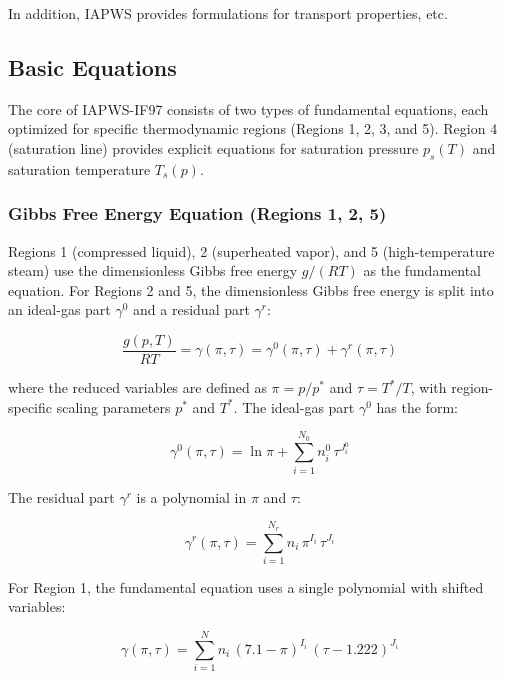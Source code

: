 \documentclass{article}
\begin{document}
In addition, IAPWS\cite{IAPWS-Releases} provides formulations for transport properties, etc.

\subsection{Basic Equations}

The core of IAPWS-IF97 consists of two types of fundamental equations, each optimized for specific thermodynamic regions (Regions 1, 2, 3, and 5). Region 4 (saturation line) provides explicit equations for saturation pressure $p_s(T)$ and saturation temperature $T_s(p)$.

\subsubsection{Gibbs Free Energy Equation (Regions 1, 2, 5)}

Regions 1 (compressed liquid), 2 (superheated vapor), and 5 (high-temperature steam) use the dimensionless Gibbs free energy $g/(RT)$ as the fundamental equation. For Regions 2 and 5, the dimensionless Gibbs free energy is split into an ideal-gas part $\gamma^0$ and a residual part $\gamma^r$:

\begin{equation}
\frac{g(p,T)}{RT} = \gamma(\pi,\tau) = \gamma^0(\pi,\tau) + \gamma^r(\pi,\tau)
\label{eq:gibbs}
\end{equation}

where the reduced variables are defined as $\pi = p/p^{*}$ and $\tau = T^{*}/T$, with region-specific scaling parameters $p^{*}$ and $T^{*}$. The ideal-gas part $\gamma^0$ has the form:

\begin{equation}
\gamma^0(\pi,\tau) = \ln\pi + \sum_{i=1}^{N_0} n_i^0 \, \tau^{J_i^0}
\label{eq:gibbs_ideal}
\end{equation}

The residual part $\gamma^r$ is a polynomial in $\pi$ and $\tau$:

\begin{equation}
\gamma^r(\pi,\tau) = \sum_{i=1}^{N_r} n_i \, \pi^{I_i} \, \tau^{J_i}
\label{eq:gibbs_residual}
\end{equation}

For Region 1, the fundamental equation uses a single polynomial with shifted variables:

\begin{equation}
\gamma(\pi,\tau) = \sum_{i=1}^{N} n_i \, (7.1 - \pi)^{I_i} \, (\tau - 1.222)^{J_i}
\label{eq:gibbs_r1}
\end{equation}
\end{document}
